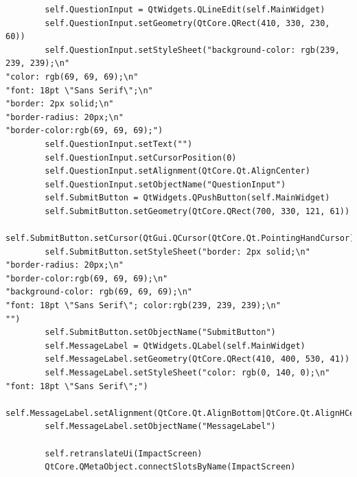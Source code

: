 \documentclass[12pt]{article}
\begin{document}
\begin{lstlisting}
        self.QuestionInput = QtWidgets.QLineEdit(self.MainWidget)
        self.QuestionInput.setGeometry(QtCore.QRect(410, 330, 230, 60))
        self.QuestionInput.setStyleSheet("background-color: rgb(239, 239, 239);\n"
"color: rgb(69, 69, 69);\n"
"font: 18pt \"Sans Serif\";\n"
"border: 2px solid;\n"
"border-radius: 20px;\n"
"border-color:rgb(69, 69, 69);")
        self.QuestionInput.setText("")
        self.QuestionInput.setCursorPosition(0)
        self.QuestionInput.setAlignment(QtCore.Qt.AlignCenter)
        self.QuestionInput.setObjectName("QuestionInput")
        self.SubmitButton = QtWidgets.QPushButton(self.MainWidget)
        self.SubmitButton.setGeometry(QtCore.QRect(700, 330, 121, 61))
        self.SubmitButton.setCursor(QtGui.QCursor(QtCore.Qt.PointingHandCursor))
        self.SubmitButton.setStyleSheet("border: 2px solid;\n"
"border-radius: 20px;\n"
"border-color:rgb(69, 69, 69);\n"
"background-color: rgb(69, 69, 69);\n"
"font: 18pt \"Sans Serif\"; color:rgb(239, 239, 239);\n"
"")
        self.SubmitButton.setObjectName("SubmitButton")
        self.MessageLabel = QtWidgets.QLabel(self.MainWidget)
        self.MessageLabel.setGeometry(QtCore.QRect(410, 400, 530, 41))
        self.MessageLabel.setStyleSheet("color: rgb(0, 140, 0);\n"
"font: 18pt \"Sans Serif\";")
        self.MessageLabel.setAlignment(QtCore.Qt.AlignBottom|QtCore.Qt.AlignHCenter)
        self.MessageLabel.setObjectName("MessageLabel")

        self.retranslateUi(ImpactScreen)
        QtCore.QMetaObject.connectSlotsByName(ImpactScreen)


\end{lstlisting}
\end{document}
